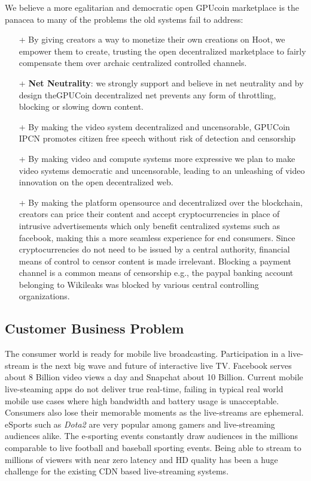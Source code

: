 \documentclass{article}
\begin{document}
We believe a more egalitarian and democratic open GPUcoin marketplace is the panacea to many of the problems the old systems fail to address:
\begin{itemize}
\item[+]By giving creators a way to monetize their own creations on Hoot, we empower them to create, trusting the open decentralized marketplace to fairly compensate them over archaic centralized controlled channels.
\item[+]\textbf{Net Neutrality}: we strongly support and believe in net neutrality and by design theGPUCoin decentralized net prevents any form of throttling, blocking or slowing down content.
\item[+]By making the video system decentralized and uncensorable, GPUCoin IPCN promotes citizen free speech without risk of detection and censorship
\item[+]By making video and compute systems more expressive we plan to make video systems democratic and uncensorable, leading to an unleashing of video innovation on the open decentralized web.

\item[+]By making the platform opensource and decentralized over the blockchain, creators can price their content and accept cryptocurrencies in place of intrusive advertisements which only benefit centralized systems such as facebook, making this a more seamless experience for end consumers. Since cryptocurrencies do not need to be issued by a central authority, financial means of control to censor content is made irrelevant. Blocking a payment channel is a common means of censorship e.g., the paypal banking account belonging to Wikileaks was blocked by various central controlling organizations.
\end{itemize}


\subsection{Customer Business Problem}
The consumer world is ready for mobile live broadcasting. Participation in a live-stream is the next big wave and future of interactive live TV. Facebook serves about 8 Billion video views a day and Snapchat about 10 Billion. Current mobile live-steaming apps do not deliver true real-time, failing in typical real world mobile use cases where high bandwidth and battery usage is unacceptable. Consumers also lose their memorable moments as the live-streams are ephemeral. eSports such as \emph{Dota2} are very popular among gamers and live-streaming audiences alike. The e-sporting events constantly draw audiences in the millions comparable to live football and baseball sporting events. Being able to stream to millions of viewers with near zero latency and HD quality has been a huge challenge for the existing CDN based live-streaming systems.
\end{document}
